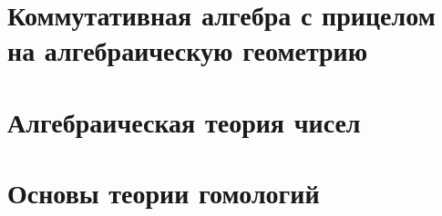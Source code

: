 \documentclass[dvipsnames, 11pt]{article}
\begin{document}
    
    \tableofcontents


    \section{Коммутативная алгебра с прицелом на алгебраическую геометрию}

    
    
    
    

    \newpage

    \section{Алгебраическая теория чисел}

    
    
    
    
    
    
    
    
    
    
    \newpage

    \section{Основы теории гомологий}
\end{document}
